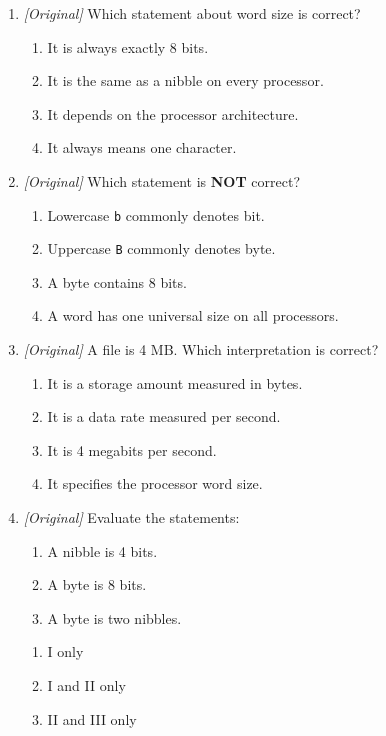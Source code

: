 \begin{enumerate}[label=\textbf{Q\arabic*.}, leftmargin=*]
\begin{enumerate}[label=\Alph*.]
    \item 16
    \item 64
  \end{enumerate}
\item \textit{[Original]} Which statement about word size is correct?
  \begin{enumerate}[label=\Alph*.]
    \item It is always exactly 8 bits.
    \item It is the same as a nibble on every processor.
    \item It depends on the processor architecture.
    \item It always means one character.
  \end{enumerate}
\item \textit{[Original]} Which statement is \textbf{NOT} correct?
  \begin{enumerate}[label=\Alph*.]
    \item Lowercase \texttt{b} commonly denotes bit.
    \item Uppercase \texttt{B} commonly denotes byte.
    \item A byte contains 8 bits.
    \item A word has one universal size on all processors.
  \end{enumerate}
\item \textit{[Original]} A file is 4 MB. Which interpretation is correct?
  \begin{enumerate}[label=\Alph*.]
    \item It is a storage amount measured in bytes.
    \item It is a data rate measured per second.
    \item It is 4 megabits per second.
    \item It specifies the processor word size.
  \end{enumerate}
\item \textit{[Original]} Evaluate the statements:
  \begin{enumerate}[label=\Roman*.]
    \item A nibble is 4 bits.
    \item A byte is 8 bits.
    \item A byte is two nibbles.
  \end{enumerate}
  \begin{enumerate}[label=\Alph*.]
    \item I only
    \item I and II only
    \item II and III only

\end{enumerate}
\end{enumerate}
